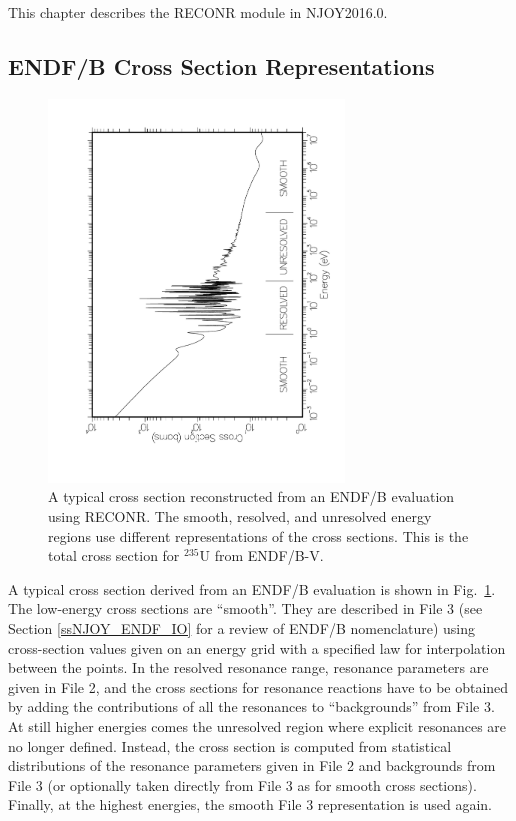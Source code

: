 This chapter describes the RECONR module in NJOY2016.0.


\subsection{ENDF/B Cross Section Representations}
\label{ssRECONR_xsrep}

\begin{figure}[b]\centering
\includegraphics[keepaspectratio,height=4.0in,angle=270]{figs/reconr1ack}
\caption[RECONR reconstructed xs with smooth, RR and URR regions]{A
   typical cross section reconstructed from an ENDF/B
   evaluation using RECONR.  The smooth, resolved, and
   unresolved energy regions use different representations of the
   cross sections.  This is the total cross section for $^{235}$U
   from ENDF/B-V.}
\label{xsfig}
\end{figure}

A typical cross section derived from an ENDF/B evaluation is
shown in Fig.~\ref{xsfig}.  The low-energy cross sections are
``smooth''.  They are described
in File 3 (see Section \ref{ssNJOY_ENDF_IO} for a review of
ENDF/B nomenclature) using cross-section values
given on an energy grid with a specified law for
interpolation between the points.
In the resolved resonance range,
resonance parameters are given in File 2, and the cross sections
for resonance reactions have to be obtained by adding the
contributions of all the resonances to ``backgrounds'' from
File 3.  At still higher energies comes the unresolved
region where explicit
resonances are no longer defined.  Instead, the cross section
is computed from statistical distributions of the resonance
parameters given in File 2 and backgrounds from File 3 (or
optionally taken directly from File 3 as for smooth cross
sections).  Finally, at the highest energies, the smooth
File 3 representation is used again.

